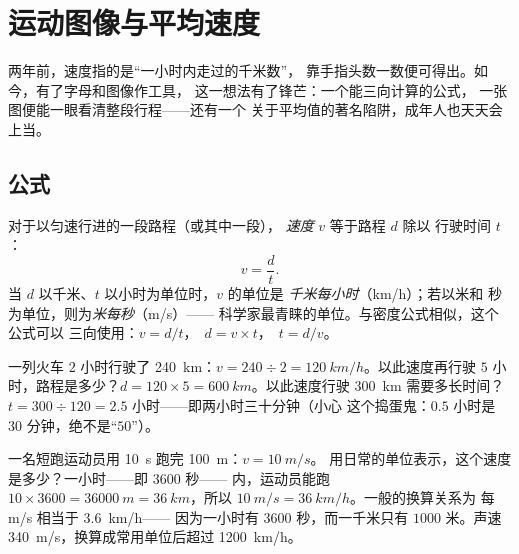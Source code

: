 \chapter{运动图像与平均速度}\label{ch:g7:motion-average-speed}

两年前，速度指的是“一小时内走过的千米数”，
靠手指头数一数便可得出。如今，有了字母和图像作工具，
这一想法有了锋芒：一个能三向计算的公式，
一张图便能一眼看清整段行程——还有一个
关于平均值的著名陷阱，成年人也天天会上当。

\section{公式}

\begin{definition}[用公式表示速度]\label{def:g7:motion-average-speed:formula}
对于以匀速行进的一段路程（或其中一段），
\emph{速度} $v$ 等于路程 $d$ 除以
行驶时间 $t$：
\[
v = \frac{d}{t}.
\]
当 $d$ 以千米、$t$ 以小时为单位时，$v$ 的单位是
\emph{千米每小时}（\unit{km/h}）；若以米和
秒为单位，则为\emph{米每秒}（\unit{m/s}）——
科学家最青睐的单位。与密度公式相似，这个公式可以
三向使用：$v = d/t$，\ $d = v \times t$，\ 
$t = d/v$。
\end{definition}

\begin{example}[公式的应用]\label{ex:g7:motion-average-speed:recipes}
一列火车 $2$ 小时行驶了 \qty{240}{km}：$v = 240 \div 2 =
\qty{120}{km/h}$。以此速度再行驶 $5$ 小时，路程是多少？$d = 120
\times 5 = \qty{600}{km}$。以此速度行驶 \qty{300}{km} 需要多长时间？$t = 300
\div 120 = 2.5$ 小时——即两小时三十分钟（小心
这个捣蛋鬼：$0.5$ 小时是 $30$ 分钟，绝不是“$50$”）。
\end{example}

\begin{example}\label{ex:g7:motion-average-speed:units}
一名短跑运动员用 \qty{10}{s} 跑完 \qty{100}{m}：$v = \qty{10}{m/s}$。
用日常的单位表示，这个速度是多少？一小时——即 $3600$ 秒——
内，运动员能跑 $10 \times 3600 = \qty{36000}{m} =
\qty{36}{km}$，所以 $\qty{10}{m/s} = \qty{36}{km/h}$。一般的换算关系为
每 \unit{m/s} 相当于 \qty{3.6}{km/h}——
因为一小时有 $3600$ 秒，而一千米只有
$1000$ 米。声速 \qty{340}{m/s}，换算成常用单位后超过
\qty{1200}{km/h}。
\end{example}

